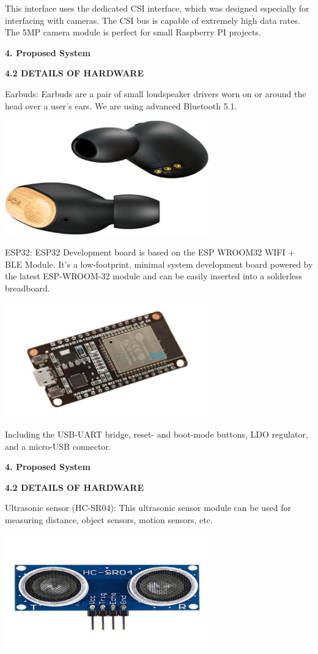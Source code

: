 \documentclass{article}
\begin{document}
This interface uses the dedicated CSI interface, which was designed
especially for interfacing with cameras. The CSI bus is capable of
extremely high data rates. The 5MP camera module is perfect for small
Raspberry PI projects.

\textbf{4. Proposed System}

\textbf{4.2 DETAILS OF HARDWARE}

{Earbuds}: Earbuds are a pair of small loudspeaker drivers worn on or
around the head over a user's ears. We are using advanced Bluetooth 5.1.

\includegraphics[width=3.46667in,height=1.95in]{media/3.jpg}

{ESP32}: ESP32 Development board is based on the ESP WROOM32 WIFI + BLE
Module. It's a low-footprint, minimal system development board powered
by the latest ESP-WROOM-32 module and can be easily inserted into a
solderless breadboard.

\includegraphics[width=3.46667in,height=1.95in]{media/4.jpg}

Including the USB-UART bridge, reset- and boot-mode buttons, LDO
regulator, and a micro-USB connector.

\textbf{4. Proposed System}

\textbf{4.2 DETAILS OF HARDWARE}

{Ultrasonic sensor (HC-SR04)}: This ultrasonic sensor module can be used
for measuring distance, object sensors, motion sensors, etc.

\includegraphics[width=3.46667in,height=1.95in]{media/5.jpg}
\end{document}
